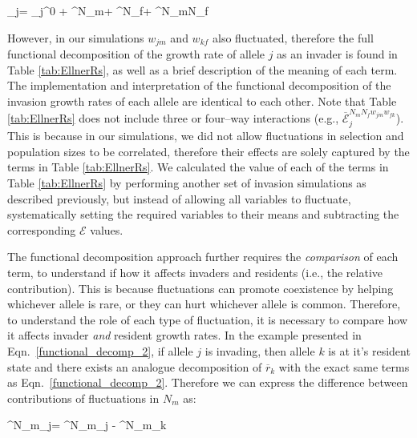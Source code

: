 \documentclass[12pt]{article}
\let\oldequation\equation
\let\oldendequation\endequation
\renewenvironment{equation}
  {\linenomathNonumbers\oldequation}
  {\oldendequation\endlinenomath}
\begin{document}
\begin{equation}
    _{j}= _{j}^{0} + ^{N_{m}}+ ^{N_{f}}+ ^{N_{m}N_{f}}
   \label{functional_decomp_2}
\end{equation}

 However, in our simulations $w_{jm}$ and $w_{kf}$ also fluctuated, therefore the full functional decomposition of the growth rate of allele $j$ as an invader is found in Table \ref{tab:EllnerRs}, as well as a brief description of the meaning of each term. The implementation and interpretation of the functional decomposition of the invasion growth rates of each allele are identical to each other. Note that Table \ref{tab:EllnerRs} does not include three or four--way interactions (e.g., $\overline{\mathcal{E}}^{N_{m}N_{f}w_{jm}w_{fk}}_{j}$). This is because in our simulations, we did not allow fluctuations in selection and population sizes to be correlated, therefore their effects are solely captured by the terms in Table \ref{tab:EllnerRs}. We calculated the value of each of the terms in Table \ref{tab:EllnerRs} by performing another set of invasion simulations as described previously, but instead of allowing all variables to fluctuate, systematically setting the required variables to their means and subtracting the corresponding $\mathcal{E}$ values.


The functional decomposition approach further requires the \textit{comparison} of each term, to understand if how it affects invaders and residents (i.e., the relative contribution). This is because fluctuations can promote coexistence by helping whichever allele is rare, or they can hurt whichever allele is common. Therefore, to understand the role of each type of fluctuation, it is necessary to compare how it affects invader \textit{and} resident growth rates. In the example presented in Eqn.~\ref{functional_decomp_2}, if allele $j$ is invading, then allele $k$ is at it's resident state and there exists an analogue decomposition of $\overline{r}_{k}$ with the exact same terms as Eqn.~\ref{functional_decomp_2}. Therefore we can express the difference between contributions of fluctuations in $N_{m}$ as:


\begin{equation}
\Delta^{N_{m}}_{j}= ^{N_{m}}_{j} - ^{N_{m}}_{k}
\label{delta}
\end{equation}
\end{document}
